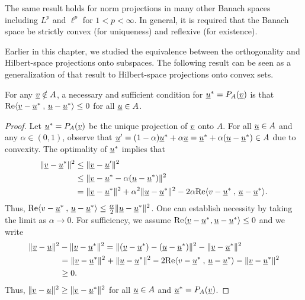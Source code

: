 \begin{remark}
The same result holds for norm projections in many other Banach spaces including $L^{p}$ and $\ell^{p}$ for $1<p<\infty$. In general, it is required that the Banach space be strictly convex (for uniqueness) and reflexive (for existence).
\end{remark}



Earlier in this chapter, we studied the equivalence between the orthogonality and Hilbert-space projections onto subspaces.
The following result can be seen as a generalization of that result to Hilbert-space projections onto convex sets.

\begin{theorem}
\label{theorem:convex_proj_lt0}
For any $\underline{v} \notin A$, a necessary and sufficient condition for $\underline{u}^* = P_A (\underline{v})$ is that $\mathrm{Re} {\langle  \underline{v}-\underline{u}^* \, \mskip1mu , \, \underline{u}-\underline{u}^*  \rangle} \leq 0$ for all $\underline{u}\in A$.
\end{theorem}
\begin{proof}
Let $\underline{u}^* = P_A (\underline{v})$ be the unique projection of $\underline{v}$ onto $A$.
For all $\underline{u} \in A$ %
and any $\alpha\in (0,1)$, observe that $\underline{u}'=(1-\alpha) \underline{u}^* + \alpha \underline{u} = \underline{u}^* + \alpha (\underline{u}-\underline{u}^*)\in A$ due to convexity.
The optimality of $\underline{u}^*$ implies that
\begin{align*}
\| \underline{v}-\underline{u}^* \|^2
&\leq \| \underline{v}- \underline{u}' \|^2 \\
&\leq \| \underline{v}- \underline{u}^* - \alpha (\underline{u}-\underline{u}^*) \|^2 \\
&= \| \underline{v} - \underline{u}^* \|^2 + \alpha^2 \| \underline{u} - \underline{u}^* \|^2 - 2 \alpha \mathrm{Re} {\langle  v-\underline{u}^* \, \mskip1mu , \, \underline{u}-\underline{u}^*  \rangle}. 
\end{align*}
Thus, $\mathrm{Re} {\langle  v-\underline{u}^* \, \mskip1mu , \, \underline{u}-\underline{u}^*  \rangle} \leq \frac{\alpha}{2} \| \underline{u} - \underline{u}^* \|^2$.
One can establish necessity by taking the limit as $\alpha \to 0$.
For sufficiency, we assume $\mathrm{Re} {\langle  \underline{v}-\underline{u}^*  \mskip1mu ,  \underline{u}-\underline{u}^*  \rangle} \leq 0$ and we write
\begin{align*}
\| \underline{v}-\underline{u} \|^2 &- \| \underline{v} - \underline{u}^* \|^2
= \| (\underline{v} - \underline{u}^*) - (\underline{u} - \underline{u}^*) \|^2 - \|\underline{v} - \underline{u}^* \|^2 \\
&= \| \underline{v}-\underline{u}^* \|^2 + \| \underline{u} -\underline{u}^* \| ^2 - 2 \mathrm{Re} {\langle  v-\underline{u}^* \, \mskip1mu , \, \underline{u}-\underline{u}^*  \rangle} - \|\underline{v}-\underline{u}^* \|^2 \\
&\geq 0.
\end{align*}
Thus, $\| \underline{v}-\underline{u} \|^2 \geq \| \underline{v} - \underline{u}^* \|^2$ for all $\underline{u} \in A$ and $\underline{u}^* = P_A (\underline{v})$.
\end{proof}

